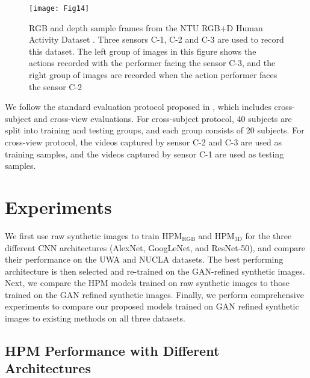 \documentclass[twocolumn]{svjour3}          \smartqed  \usepackage{graphicx}
\begin{document}
\begin{figure}[t]
\centering
\texttt{[image: Fig14]}
\caption{RGB and depth sample frames from the NTU RGB+D Human Activity Dataset \citep{shahroudy2016ntu}. Three sensors C-1, C-2 and C-3 are used to record this dataset. The left group of images in this figure shows the actions recorded with the performer facing the sensor C-3, and the right group of images are recorded when the action performer faces the sensor C-2}
\label{fig:ntu_samples}
\end{figure}

We follow the standard evaluation protocol proposed in \citep{shahroudy2016ntu}, which includes cross-subject and cross-view evaluations. For cross-subject protocol, 40 subjects are split into training and testing groups, and each group consists of 20 subjects. For cross-view protocol, the videos captured by sensor C-2 and C-3 are used as training samples, and the videos captured by sensor C-1 are used as testing samples. 

\vspace{-2mm}
\section{Experiments}
\label{sec:Exp}







We first use raw synthetic images to train HPM$_{\mathrm{RGB}}$ and HPM$_{\mathrm{3D}}$ for the three different CNN architectures (AlexNet, GoogLeNet, and ResNet-50), and compare their performance on the UWA and NUCLA datasets. The best performing  architecture is then selected and re-trained on the GAN-refined synthetic images. Next, we compare the HPM models trained on raw synthetic images to those trained on the GAN refined synthetic images. Finally, we perform comprehensive experiments to compare our proposed models trained on GAN refined synthetic images to existing methods on all three datasets.

\vspace{-2mm}
\subsection{HPM Performance with Different Architectures}
\end{document}
